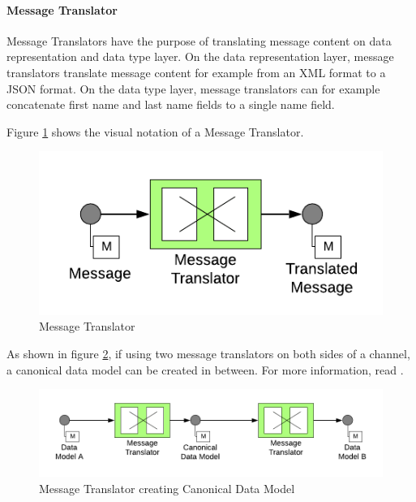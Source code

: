 \paragraph{Message Translator}

Message Translators have the purpose of translating message content on data representation and data type layer. 
On the data representation layer, message translators translate message content for example from an XML format to a JSON format. On the data type layer, message translators can for example concatenate first name and last name fields to a single name field.

Figure \ref{messaging:translator1} shows the visual notation of a Message Translator.

\begin{figure}[H]
    \centering
    \includegraphics[scale=0.6]{Diagrams/Messaging/6. Message Translator.pdf}
    \caption{Message Translator}
    \label{messaging:translator1}
\end{figure}

As shown in figure \ref{messaging:translator2}, if using two message translators on both sides of a channel, a canonical data model can be created in between. For more information, read \textcite[p. 355]{EIP}.

\begin{figure}[H]
    \centering
    \includegraphics[scale=0.6]{Diagrams/Messaging/7. Message Translator.pdf}
    \caption{Message Translator creating Canonical Data Model}
    \label{messaging:translator2}
\end{figure}

